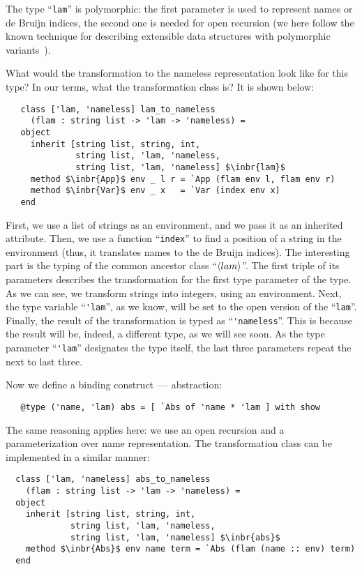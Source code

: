 The type ``\lstinline{lam}'' is polymorphic: the first parameter is used to represent names or de Bruijn indices, the second one is needed
for open recursion (we here follow the known technique for describing extensible data structures with polymorphic variants~\cite{PolyVarReuse}).

What would the transformation to the nameless representation look like for this type? In our terms, what the transformation class is? It is shown
below:

\begin{lstlisting}
   class ['lam, 'nameless] lam_to_nameless
     (flam : string list -> 'lam -> 'nameless) =
   object
     inherit [string list, string, int,
              string list, 'lam, 'nameless,
              string list, 'lam, 'nameless] $\inbr{lam}$
     method $\inbr{App}$ env _ l r = `App (flam env l, flam env r)
     method $\inbr{Var}$ env _ x   = `Var (index env x)
   end
\end{lstlisting}

First, we use a list of strings as an environment, and we pass it as an inherited attribute. Then, we use a function ``\lstinline{index}'' to find a
position of a string in the environment (thus, it translates names to the de Bruijn indices). The interesting part is the typing of the common ancestor
class ``$\left<lam\right>$''. The first triple of its parameters describes the transformation for the first type parameter of the type. As we can see, we
transform strings into integers, using an environment. Next, the type variable ``\lstinline{'lam}'', as we know, will be set to the open version of the ``\lstinline{lam}''.
Finally, the result of the transformation is typed as ``\lstinline{'nameless}''. This is because the result will be, indeed, a different type, as we
will see soon. As the type parameter ``\lstinline{'lam}'' designates the type itself, the last three parameters repeat the next to last three.

Now we define a binding construct~--- abstraction:

\begin{lstlisting}
   @type ('name, 'lam) abs = [ `Abs of 'name * 'lam ] with show
\end{lstlisting}

The same reasoning applies here: we use an open recursion and a parameterization over name representation. The transformation class can be
implemented in a similar manner:

\begin{lstlisting}
  class ['lam, 'nameless] abs_to_nameless
    (flam : string list -> 'lam -> 'nameless) =
  object
    inherit [string list, string, int,
             string list, 'lam, 'nameless,
             string list, 'lam, 'nameless] $\inbr{abs}$
    method $\inbr{Abs}$ env name term = `Abs (flam (name :: env) term)
  end
\end{lstlisting}


